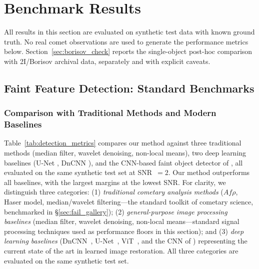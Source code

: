 \documentclass[usenatbib]{mnras}
\begin{document}
\section{Benchmark Results}\label{sec:results}

All results in this section are evaluated on synthetic test data with known ground truth. No real comet observations are used to generate the performance metrics below. Section~\ref{sec:borisov_check} reports the single-object post-hoc comparison with 2I/Borisov archival data, separately and with explicit caveats.

\subsection{Faint Feature Detection: Standard Benchmarks}

\subsubsection{Comparison with Traditional Methods and Modern Baselines}

Table~\ref{tab:detection_metrics} compares our method against three traditional methods (median filter, wavelet denoising, non-local means), two deep learning baselines (U-Net \citealt{ronneberger15}, DnCNN \citealt{zhang17}), and the CNN-based faint object detector of \citet{jiang23}, all evaluated on the same synthetic test set at SNR~$=2$. Our method outperforms all baselines, with the largest margins at the lowest SNR. For clarity, we distinguish three categories: (1) \textit{traditional cometary analysis methods} ($Af\rho$, Haser model, median/wavelet filtering---the standard toolkit of cometary science, benchmarked in \S\ref{sec:fail_gallery}); (2) \textit{general-purpose image processing baselines} (median filter, wavelet denoising, non-local means---standard signal processing techniques used as performance floors in this section); and (3) \textit{deep learning baselines} (DnCNN~\citealt{zhang17}, U-Net~\citealt{ronneberger15}, ViT~\citealt{dosovitskiy21}, and the CNN of \citet{jiang23}) representing the current state of the art in learned image restoration. All three categories are evaluated on the same synthetic test set.
\end{document}
